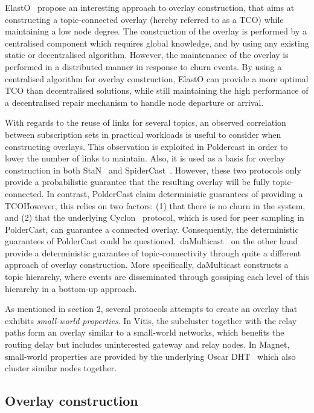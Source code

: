 ElastO~\cite{Chen:2013} propose an interesting approach to overlay construction,
that aims at constructing a topic-connected overlay (hereby referred to
as a TCO) while maintaining a
low node degree. The construction of the overlay is performed by a centralised
component which requires global knowledge, and by using any existing static or
decentralised algorithm. However, the maintenance of the overlay is
performed in a distributed manner in response to churn events. By using
a centralised algorithm for overlay construction, ElastO can provide a
more optimal TCO than decentralised solutions, while still maintaining
the high performance of a decentralised repair mechanism to handle node
departure or arrival.

With regards to the reuse of links for several topics, an observed
correlation~\cite{Liu:2005} between subscription sets in practical
workloads is useful to consider when constructing overlays. This
observation is exploited in Poldercast in order to lower the number of
links to maintain. Also, it is used as a basis for overlay construction
in both StaN~\cite{Matos:2010} and SpiderCast~\cite{Chockler:2007}.
However, these two protocols only provide a probabilistic guarantee that
the resulting overlay will be fully topic-connected. In contrast,
PolderCast claim deterministic guarantees of providing a TCO\. However,
this relies on two factors: (1) that there is no churn in the system,
and (2) that the underlying Cyclon~\cite{Voulgaris:2005} protocol, which
is used for peer sampling in PolderCast, can guarantee a connected
overlay.  Consequently, the deterministic guarantees of PolderCast could
be questioned.\ daMulticast~\cite{Baehni:2004} on the other hand provide
a deterministic guarantee of topic-connectivity through quite a
different approach of overlay construction. More specifically,
daMulticast constructs a topic hierarchy, where events are disseminated
through gossiping each level of this hierarchy in a bottom-up approach.

As mentioned in section 2, several protocols attempts to create an overlay that
exhibits \emph{small-world properties}. In Vitis, the subcluster
together with the relay paths form an overlay similar to a small-world
networks, which benefits the routing delay but includes
uninterested gateway and relay nodes. In Magnet, small-world properties
are provided by the underlying Oscar DHT~\cite{girdzijauskas2007oscar}
which also cluster similar nodes together.

\subsection{Overlay construction}

